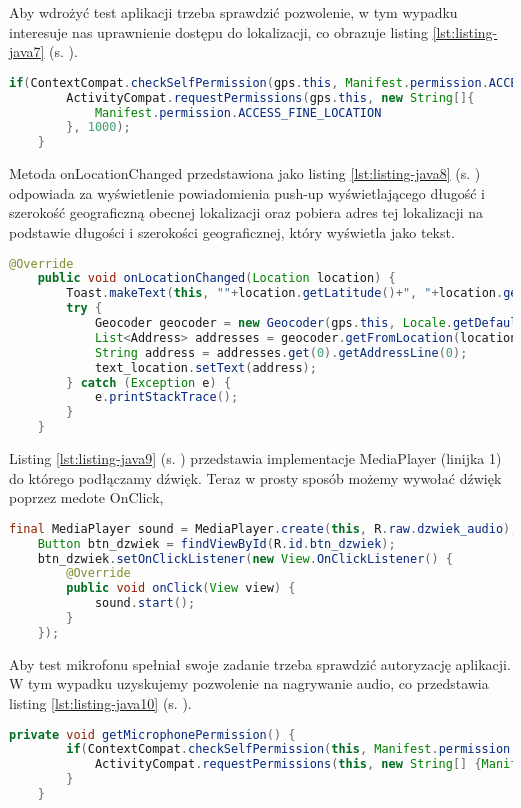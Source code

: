 Aby wdrożyć test aplikacji trzeba sprawdzić pozwolenie, w tym wypadku interesuje nas uprawnienie dostępu do lokalizacji, co obrazuje listing  \ref{lst:listing-java7} (s. \pageref{lst:listing-java7}). 
\begin{lstlisting}[caption=GPS - Dostęp do lokazlizacji, label={lst:listing-java7}, language=Java]
	if(ContextCompat.checkSelfPermission(gps.this, Manifest.permission.ACCESS_FINE_LOCATION) != PackageManager.PERMISSION_GRANTED) {
		ActivityCompat.requestPermissions(gps.this, new String[]{
			Manifest.permission.ACCESS_FINE_LOCATION
		}, 1000);
	}
\end{lstlisting}

\newpage


Metoda onLocationChanged przedstawiona jako listing \ref{lst:listing-java8} (s. \pageref{lst:listing-java8}) odpowiada za wyświetlenie powiadomienia push-up wyświetlającego długość i szerokość geograficzną obecnej lokalizacji oraz pobiera adres tej lokalizacji na podstawie długości i szerokości geograficznej, który wyświetla jako tekst.
\begin{lstlisting}[caption=GPS - Wysliwetlanie lokalizacji, label={lst:listing-java8}, language=Java]
	@Override
	public void onLocationChanged(Location location) {
		Toast.makeText(this, ""+location.getLatitude()+", "+location.getLongitude(), Toast.LENGTH_SHORT).show();
		try {
			Geocoder geocoder = new Geocoder(gps.this, Locale.getDefault());
			List<Address> addresses = geocoder.getFromLocation(location.getLatitude(), location.getLongitude(), 1);
			String address = addresses.get(0).getAddressLine(0);
			text_location.setText(address);
		} catch (Exception e) {
			e.printStackTrace();
		}
	}
\end{lstlisting}


Listing \ref{lst:listing-java9} (s. \pageref{lst:listing-java9}) przedstawia implementacje MediaPlayer (linijka 1) do którego podłączamy dźwięk. Teraz w prosty sposób możemy wywołać dźwięk poprzez medote OnClick,
\begin{lstlisting}[caption= Dźwięk - Działanie z wykorzystaniem MediaPlayer, label={lst:listing-java9}, language=Java]
	final MediaPlayer sound = MediaPlayer.create(this, R.raw.dzwiek_audio);
	Button btn_dzwiek = findViewById(R.id.btn_dzwiek);
	btn_dzwiek.setOnClickListener(new View.OnClickListener() {
		@Override
		public void onClick(View view) {
			sound.start();
		}
	});
\end{lstlisting}

\newpage


Aby test mikrofonu spełniał swoje zadanie trzeba sprawdzić autoryzację aplikacji. W tym wypadku uzyskujemy pozwolenie na nagrywanie audio, co przedstawia listing \ref{lst:listing-java10} (s. \pageref{lst:listing-java10}). 
\begin{lstlisting}[caption=Mikrofon - Dostęp do nagrywania audio, label={lst:listing-java10}, language=Java]
	private void getMicrophonePermission() {
		if(ContextCompat.checkSelfPermission(this, Manifest.permission.RECORD_AUDIO) == PackageManager.PERMISSION_DENIED) {
			ActivityCompat.requestPermissions(this, new String[] {Manifest.permission.RECORD_AUDIO}, MICROPHONE_PERMISSION_CODE);
		}
	}
\end{lstlisting}


